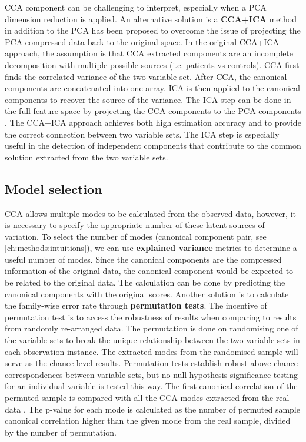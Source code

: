 CCA component can be challenging to interpret, especially when a PCA dimension reduction is applied. An alternative solution is a \textbf{CCA+ICA} method in addition to the PCA \cite{MillerK2016,Sui2010} has been proposed to overcome the issue of projecting the PCA-compressed data back to the original space. In the original CCA+ICA approach, the assumption is that CCA extracted components are an incomplete decomposition with multiple possible sources (i.e. patients vs controls). CCA first finds the correlated variance of the two variable set. After CCA, the canonical components are concatenated into one array. ICA is then applied to the canonical components to recover the source of the variance. The ICA step can be done in the full feature space by projecting the CCA components to the PCA components \cite{MillerK2016}. The CCA+ICA approach achieves both high estimation accuracy and to provide the correct connection between two variable sets. The ICA step is especially useful in the detection of independent components that contribute to the common solution extracted from the two variable sets.

\subsection{Model selection}
CCA allows multiple modes to be calculated from the observed data, however, it is necessary to specify the appropriate number of these latent sources of variation. To select the number of modes (canonical component pair, see \cref{ch:methods:intuitions}), we can use \textbf{explained variance} metrics to determine a useful number of modes. Since the canonical components are the compressed information of the original data, the canonical component would be expected to be related to the original data. The calculation can be done by predicting the canonical components with the original scores. Another solution is to calculate the family-wise error rate through \textbf{permutation tests}. The incentive of permutation test is to access the robustness of results when comparing to results from randomly re-arranged data. The permutation is done on randomising one of the variable sets to break the unique relationship between the two variable sets in each observation instance. The extracted modes from the randomised sample will serve as the chance level results. Permutation tests establish robust above-chance correspondences between variable sets, but no null hypothesis significance testing for an individual variable is tested this way. The first canonical correlation of the permuted sample is compared with all the CCA modes extracted from the real data . The p-value for each mode is calculated as the number of permuted sample canonical correlation higher than the given mode from the real sample, divided by the number of permutation.

